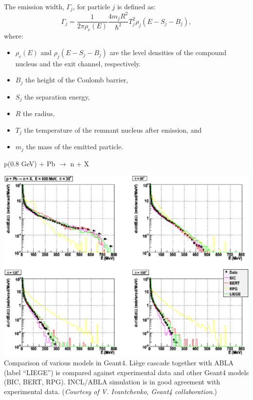\documentclass[20pt]{article}
\newenvironment{textbox}
{\begin{lrbox}{\dummybox}\begin{minipage}{0.9\columnwidth}}
{\end{minipage}\end{lrbox}\raisebox{-\depth}{\psshadowbox[framesep=1em,framearc=.1,shadow=true]{\usebox{\dummybox}}}\vspace{0.005\textheight}}
\begin{document}
\begin{center}
\begin{multicols}{3}
\begin{textbox}
{The emission width, $\Gamma_j$, for particle $j$ is defined as:
\begin{equation}
\Gamma_j = \frac{1}{2 \pi \rho_c(E)} \frac{4 m_j R^2}{\hbar^2} T_j^2 \rho_j(E - S_j - B_j),
\label{eqn:emissionwidth}
\end{equation}
where:
\begin{itemize}
\item $\rho_c(E)$ and $\rho_j(E - S_j - B_j)$ are the level densities
of the compound nucleus and the exit channel, respectively.
\item $B_j$ the height of the Coulomb barrier,
\item $S_j$ the separation energy,
\item $R$ the radius,
\item $T_j$ the temperature of the remnant nucleus after
emission, and
\item $m_j$ the mass of the emitted particle.
\end{itemize}
}
\end{textbox}

{\Huge {\sf p(0.8 GeV) + Pb $\rightarrow$ n + X}}

\includegraphics[scale=0.45]{images/vladimir.eps}
{\Large {\sf Comparison of various models in {\sf Geant4}. Li\`ege cascade together with ABLA (label ``LIEGE'') is compared against experimental data and other {\sf Geant4} models (BIC, BERT, RPG).
 {\sf INCL/ABLA} simulation is in good agreement with experimental data. (\emph{Courtesy of
    V. Ivantchenko, Geant4 collaboration}.)}}


\end{multicols}
\end{center}
\end{document}

